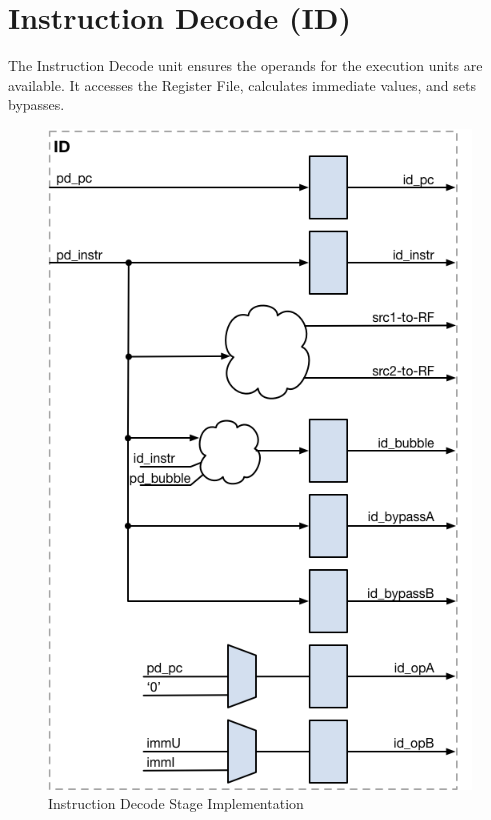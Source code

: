 \pagebreak

\section{Instruction Decode (ID)}\label{instruction-decode-id-1}

The Instruction Decode unit ensures the operands for the execution units are available. 
It accesses the Register File, calculates immediate values, and sets bypasses.

\begin{figure}[h]
  \includegraphics{assets/img/Pipeline-ID}
  \caption{Instruction Decode Stage Implementation}
\end{figure}


